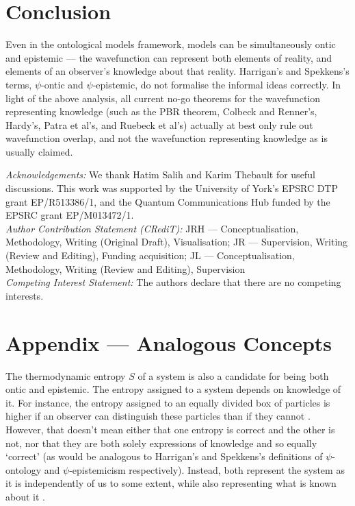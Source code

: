 \documentclass[superscriptaddress, floatfix,nofootinbib,12pt]{revtex4-2}
\begin{document}
\section{Conclusion}

Even in the ontological models framework, models can be simultaneously ontic and epistemic --- the wavefunction can represent both elements of reality, and elements of an observer's knowledge about that reality. Harrigan's and Spekkens's terms, $\psi$-ontic and $\psi$-epistemic, do not formalise the informal ideas correctly. In light of the above analysis, all current no-go theorems for the wavefunction representing knowledge (such as the PBR theorem, Colbeck and Renner's, Hardy's, Patra et al's, and Ruebeck  et al's) actually at best only rule out wavefunction overlap, and not the wavefunction representing knowledge as is usually claimed.

\begin{acknowledgements} \textit{Acknowledgements:} We thank Hatim Salih and Karim Thebault for useful discussions. This work was supported by the University of York's EPSRC DTP grant EP/R513386/1, and the Quantum Communications Hub funded by the EPSRC grant EP/M013472/1.\\
\textit{Author Contribution Statement (CRediT):} JRH --- Conceptualisation, Methodology, Writing (Original Draft), Visualisation; JR --- Supervision, Writing (Review and Editing), Funding acquisition; JL --- Conceptualisation, Methodology, Writing (Review and Editing), Supervision\\
\textit{Competing Interest Statement:} The authors declare that there are no competing interests.
\end{acknowledgements}




\appendix
\section{Appendix --- Analogous Concepts}
The thermodynamic entropy $S$ of a system is also a candidate for being both ontic and epistemic. The entropy assigned to a system depends on knowledge of it. For instance, the entropy assigned to an equally divided box of particles is higher if an observer can distinguish these particles than if they cannot \cite{Cheng2009Thermodynamics}. However, that doesn't mean either that one entropy is correct and the other is not, nor that they are both solely expressions of knowledge and so equally `correct' (as would be analogous to Harrigan's and Spekkens's definitions of $\psi$-ontology and $\psi$-epistemicism respectively). Instead, both represent the system as it is independently of us to some extent, while also representing what is known about it \cite{Ladyman2008UseofITEntropy}.
\end{document}
